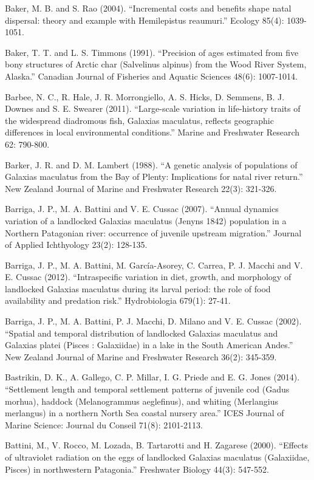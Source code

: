 \documentclass[]{book}
\begin{document}
Baker, M. B. and S. Rao (2004). ``Incremental costs and benefits shape
natal dispersal: theory and example with Hemilepistus reaumuri.''
Ecology 85(4): 1039-1051.

Baker, T. T. and L. S. Timmons (1991). ``Precision of ages estimated
from five bony structures of Arctic char (Salvelinus alpinus) from the
Wood River System, Alaska.'' Canadian Journal of Fisheries and Aquatic
Sciences 48(6): 1007-1014.

Barbee, N. C., R. Hale, J. R. Morrongiello, A. S. Hicks, D. Semmens, B.
J. Downes and S. E. Swearer (2011). ``Large-scale variation in
life-history traits of the widespread diadromous fish, Galaxias
maculatus, reflects geographic differences in local environmental
conditions.'' Marine and Freshwater Research 62: 790-800.

Barker, J. R. and D. M. Lambert (1988). ``A genetic analysis of
populations of Galaxias maculatus from the Bay of Plenty: Implications
for natal river return.'' New Zealand Journal of Marine and Freshwater
Research 22(3): 321-326.

Barriga, J. P., M. A. Battini and V. E. Cussac (2007). ``Annual dynamics
variation of a landlocked Galaxias maculatus (Jenyns 1842) population in
a Northern Patagonian river: occurrence of juvenile upstream
migration.'' Journal of Applied Ichthyology 23(2): 128-135.

Barriga, J. P., M. A. Battini, M. García-Asorey, C. Carrea, P. J. Macchi
and V. E. Cussac (2012). ``Intraspecific variation in diet, growth, and
morphology of landlocked Galaxias maculatus during its larval period:
the role of food availability and predation risk.'' Hydrobiologia
679(1): 27-41.

Barriga, J. P., M. A. Battini, P. J. Macchi, D. Milano and V. E. Cussac
(2002). ``Spatial and temporal distribution of landlocked Galaxias
maculatus and Galaxias platei (Pisces : Galaxiidae) in a lake in the
South American Andes.'' New Zealand Journal of Marine and Freshwater
Research 36(2): 345-359.

Bastrikin, D. K., A. Gallego, C. P. Millar, I. G. Priede and E. G. Jones
(2014). ``Settlement length and temporal settlement patterns of juvenile
cod (Gadus morhua), haddock (Melanogrammus aeglefinus), and whiting
(Merlangius merlangus) in a northern North Sea coastal nursery area.''
ICES Journal of Marine Science: Journal du Conseil 71(8): 2101-2113.

Battini, M., V. Rocco, M. Lozada, B. Tartarotti and H. Zagarese (2000).
``Effects of ultraviolet radiation on the eggs of landlocked Galaxias
maculatus (Galaxiidae, Pisces) in northwestern Patagonia.'' Freshwater
Biology 44(3): 547-552.
\end{document}
